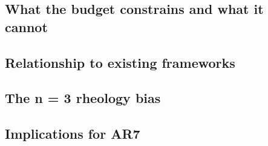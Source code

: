 \documentclass[11pt]{article}
\begin{document}
\subsection{What the budget constrains and what it cannot}
%

\subsection{Relationship to existing frameworks}
%
%
%

\subsection{The n = 3 rheology bias}
%

\subsection{Implications for AR7}
%
\end{document}
